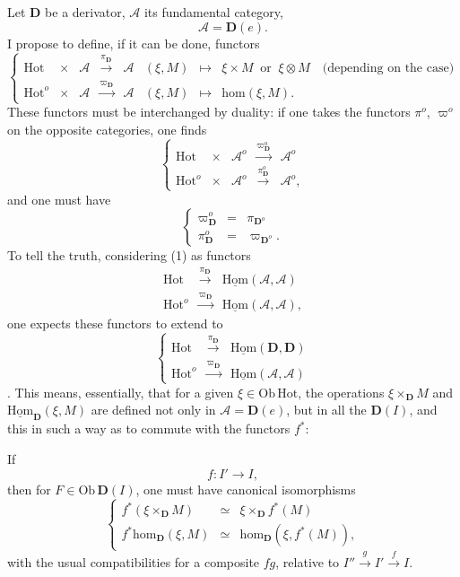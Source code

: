 \documentclass[11pt]{article}
\newcommand{\printedpage}[1]{\marginpar{\footnotesize p.~#1}}
\newcommand{\msp}[1]{\marginpar{\footnotesize [#1]}}
\newcommand{\Hot}{\mathrm{Hot}}
\newcommand{\D}{\mathbf{D}}
\newcommand{\uHom}{\underline{\mathrm{Hom}}}
\newcommand{\hm}{\mathrm{hom}}
\begin{document}
Let $\D$ be a derivator, $\mathcal{A}$ its fundamental category,
\[
\mathcal{A} = \D(e).
\]
I propose to define, if it can be done, functors
\[
\left\{
\begin{array}{rccccccl}
\Hot & \times & \mathcal{A} & \xrightarrow{\pi_{\D}} & \mathcal{A} & (\xi, M) & \longmapsto & \xi \times M \ \text{ or } \ \xi \otimes M \quad \text{(depending on the case)}\\
\Hot^o & \times & \mathcal{A} & \xrightarrow{\varpi_{\D}} & \mathcal{A} & (\xi, M) & \longmapsto & \hm(\xi, M).
\end{array}
\right.
\tag*{(1)}
\]
These functors must be interchanged by duality: if one takes the functors $\pi^o$, $\varpi^o$ on the opposite categories, one finds
\[
\left\{
\begin{array}{rcccc}
\Hot & \times & \mathcal{A}^o & \xrightarrow{\varpi^o_{\D}} & \mathcal{A}^o\\
\Hot^o & \times & \mathcal{A}^o & \xrightarrow{\pi^o_{\D}} & \mathcal{A}^o,
\end{array}
\right.
\tag*{(1$'$)}
\]
and one must have
\[
\left\{
\begin{array}{rcl}
\varpi^o_{\D} & = & \pi_{\D^o}\\
\pi^o_{\D} & = & \varpi_{\D^o}.
\end{array}
\right.
\]
To tell the truth, considering (1) as functors
\[
\begin{array}{rcl}
\Hot & \xrightarrow{\pi_{\D}} & \uHom(\mathcal{A}, \mathcal{A})\\
\Hot^o & \xrightarrow{\varpi_{\D}} & \uHom(\mathcal{A}, \mathcal{A}),
\end{array}
\]
one expects these functors to extend to
\[
\left\{
\begin{array}{rcl}
\Hot & \xrightarrow{\pi_{\D}} & \uHom(\D, \D)\\
\Hot^o & \xrightarrow{\varpi_{\D}} & \uHom(\mathcal{A}, \mathcal{A})
\end{array}
\right.
\tag*{(2)}
\]
. This means, essentially, that for a given $\xi \in \mathrm{Ob}\,\Hot$, the operations $\xi \times_{\D} M$ and $\uHom_{\D}(\xi, M)$ are defined not only in $\mathcal{A} = \D(e)$, but in all the $\D(I)$, and this in such a way as to commute with the functors $f^*$:

\msp{page 2}
If
\[
f : I' \longrightarrow I,
\]
\printedpage{2}
then for $F \in \mathrm{Ob}\,\D(I)$, one must have canonical isomorphisms
\[
\left\{
\begin{array}{rcl}
f^*(\xi \times_{\D} M) & \simeq & \xi \times_{\D} f^*(M)\\
f^*\hm_{\D}(\xi, M) & \simeq & \hm_{\D}(\xi, f^*(M)),
\end{array}
\right.
\tag*{(3)}
\]
with the usual compatibilities for a composite $fg$, relative to $I'' \xrightarrow{g} I' \xrightarrow{f} I$.
\end{document}
